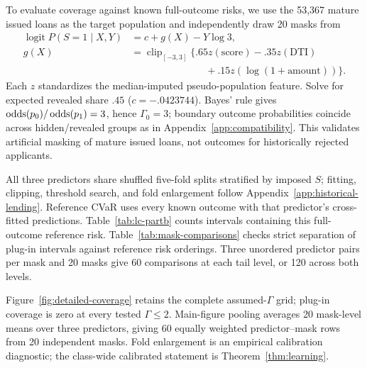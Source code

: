 To evaluate coverage against known full-outcome risks, we use the 53,367 mature issued loans as the target population and independently draw 20 masks from
\[
\begin{aligned}
\operatorname{logit}P(S=1\mid X,Y)&=c+g(X)-Y\log3,\\
g(X)&=\operatorname{clip}_{[-3,3]}\bigl\{.65z(\text{score})-.35z(\text{DTI})\\
&\hspace{90pt}+.15z(\log(1+\text{amount}))\bigr\}.
\end{aligned}
\]
Each $z$ standardizes the median-imputed pseudo-population feature. Solve for
expected revealed share $.45$ ($c=-.0423744$). Bayes' rule gives
$\operatorname{odds}(p_0)/\operatorname{odds}(p_1)=3$, hence $\Gamma_0=3$; boundary outcome probabilities
coincide across hidden/revealed groups as in Appendix~\ref{app:compatibility}.
This validates artificial masking of mature issued loans, not outcomes for
historically rejected applicants.

All three predictors share shuffled five-fold splits stratified by imposed $S$; fitting,
clipping, threshold search, and fold enlargement follow
Appendix~\ref{app:historical-lending}. Reference CVaR uses every known outcome with that
predictor's cross-fitted predictions. Table~\ref{tab:lc-partb} counts intervals containing
this full-outcome reference risk. Table~\ref{tab:mask-comparisons} checks strict separation
of plug-in intervals against reference risk orderings. Three unordered predictor pairs per
mask and 20 masks give 60 comparisons at each tail level, or 120 across both levels.

\begin{samepage}
Figure~\ref{fig:detailed-coverage} retains the complete assumed-$\Gamma$ grid; plug-in
coverage is zero at every tested $\Gamma\le2$. Main-figure pooling averages 20 mask-level
means over three predictors, giving 60 equally weighted predictor--mask rows from 20
independent masks. Fold enlargement is an empirical calibration diagnostic; the class-wide
calibrated statement is Theorem~\ref{thm:learning}.
\par\end{samepage}

